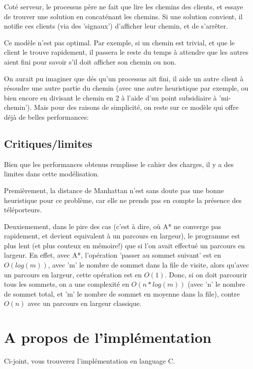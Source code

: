 \documentclass[10pt]{article}
\begin{document}
			Coté serveur, le processus père ne fait que lire les chemins des clients, et essaye de trouver une
			solution en concaténant les chemins. Si une solution convient, il notifie ces clients (via des 'signaux')
			d'afficher leur chemin, et de s'arrêter.\newline
			
			Ce modèle n'est pas optimal. Par exemple, si un chemin est trivial, et que le client
			le trouve rapidement, il passera le reste du temps à attendre que les autres aient fini
			pour savoir s'il doit afficher son chemin ou non.\newline
			
			On aurait pu imaginer que dés qu'un processus ait fini, il aide un autre client à résoudre une autre partie du chemin
			(avec une autre heuristique par exemple, ou bien encore en divisant le chemin en 2 à l'aide d'un point subsidiaire à 'mi-chemin').
			Mais pour des raisons de simplicité, on reste sur ce modèle qui offre déjà de belles performances:
			
		\subsection{Critiques/limites}
		
			Bien que les performances obtenus remplisse le cahier des charges, il y a des limites dans cette modélisation.
			
			Premièrement, la distance de Manhattan n'est sans doute pas une bonne heuristique pour ce problème, car elle ne prends
			pas en compte la présence des téléporteurs.
			
			Deuxiemement, dans le pire des cas (c'est à dire, où A* ne converge pas rapidement, et devient equivalent à un parcours en largeur),
			le programme est plus lent (et plus couteux en mémoire!) que si l'on avait effectué un parcours en largeur.
			En effet, avec A*, l'opération 'passer au sommet suivant' est en \(O(log(m))\), avec 'm' le nombre de sommet dans la file de visite,
			alors qu'avec un parcours en largeur, cette opération est en \(O(1)\).
			Donc, si on doit parcourir tous les sommets, on a une complexité en \(O(n * log(m))\) (avec 'n' le nombre de sommet total, et
			'm' le nombre de sommet en moyenne dans la file), contre \(O(n)\) avec un parcours en largeur classique.

	\section{A propos de l'implémentation}
		Ci-joint, vous trouverez l'implémentation en language C.
\end{document}
